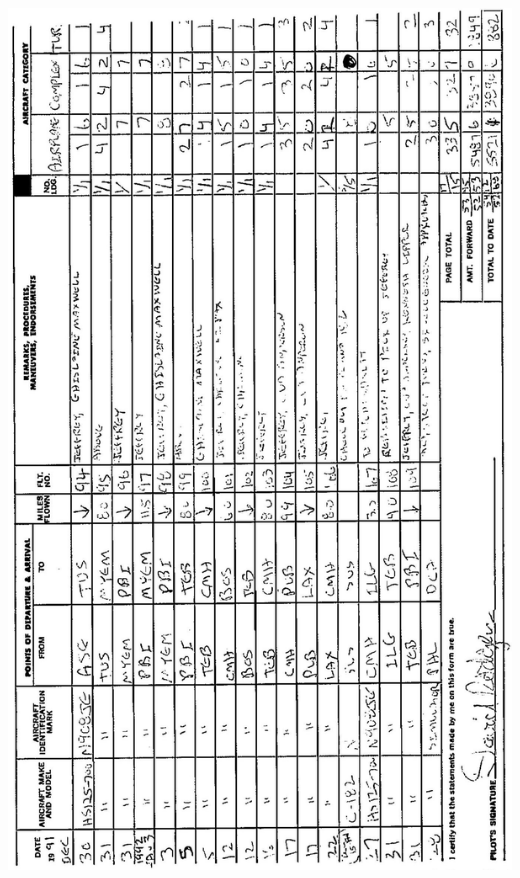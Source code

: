 \documentclass[10pt]{article}
\begin{document}
\includegraphics[max width=\textwidth, center]{2025_02_27_dd68c3d38de88f0516d9g-011}\\
\end{document}
